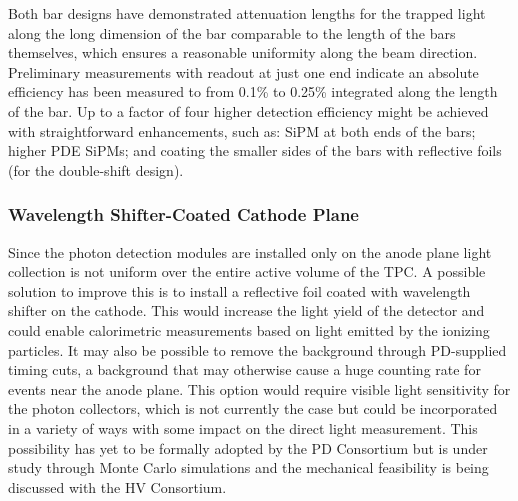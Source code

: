 Both bar designs have demonstrated attenuation lengths for the  trapped light along the long dimension of the bar comparable to the length of the bars themselves, which ensures a reasonable uniformity along the beam direction. Preliminary measurements with readout at just one end indicate an absolute efficiency has been measured to from \num{0.1}\% to \num{0.25}\% integrated along the length of the bar. 
Up to a factor of four higher detection efficiency might be achieved with straightforward enhancements, such as:  SiPM at both ends of the bars; higher PDE SiPMs; and coating the smaller sides of the bars with reflective foils (for the double-shift design). 

\subsubsection{Wavelength Shifter-Coated Cathode Plane} 
Since the photon detection modules are installed only on the anode plane light collection is not uniform over the entire active volume of the TPC. A possible solution to improve this is to install a reflective foil coated with wavelength shifter on the cathode.
This would increase the light yield of the detector and could enable calorimetric measurements based on light emitted by the ionizing particles. It may also be possible to remove the  background through PD-supplied timing cuts, a background that may otherwise cause a huge counting rate for events near the anode plane. This option would require visible light sensitivity for the photon collectors, which is not currently the case but could be incorporated in a variety of ways with some impact on the direct light measurement. This possibility has yet to be formally adopted by the PD Consortium but is under study through Monte Carlo simulations and the mechanical feasibility is being discussed with the HV Consortium.


